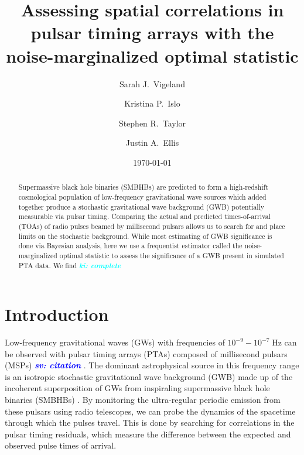 \documentclass[twocolumn,aps,prd,superscriptaddress]{revtex4-1}
\newcommand{\sv}[1]{\textcolor{blue}{\it{\textbf{sv: #1}}} }
\newcommand{\ki}[1]{\textcolor{cyan}{\it{\textbf{ki: #1}}} }
\begin{document}
\title{Assessing spatial correlations in pulsar timing arrays with the noise-marginalized optimal statistic}


\author{Sarah J.\ Vigeland}

\author{Kristina P.\ Islo}

\author{Stephen R.\ Taylor}

\author{Justin A.\ Ellis}

\date{\today}  

\begin{abstract}
Supermassive black hole binaries (SMBHBs) are predicted to form a high-redshift cosmological population of low-frequency gravitational wave sources which added together produce a stochastic gravitational wave background (GWB) potentially measurable via pulsar timing. Comparing the actual and predicted times-of-arrival (TOAs) of radio pulses beamed by millisecond pulsars allows us to search for and place limits on the stochastic background. While most estimating of GWB significance is done via Bayesian analysis, here we use a frequentist estimator called the noise-marginalized optimal statistic to assess the significance of a GWB present in simulated PTA data. We find \ki{complete}

\end{abstract}

\maketitle


\section{Introduction}

Low-frequency gravitational waves (GWs) with frequencies of 
$10^{-9} - 10^{-7} \; \mathrm{Hz}$ can be observed with pulsar timing arrays (PTAs) 
composed of millisecond pulsars (MSPs) \sv{citation}. 
The dominant astrophysical source in this frequency range is an isotropic stochastic 
gravitational wave background (GWB) 
made up of the incoherent superposition of GWs from inspiraling 
supermassive black hole binaries (SMBHBs) 
\citep{1995ApJ...446..543R, 2003ApJ...583..616J, 2003ApJ...590..691W}. 
By monitoring the ultra-regular periodic emission from these pulsars using radio telescopes, 
we can probe the dynamics of the spacetime through which the pulses travel. 
This is done by searching for correlations in the pulsar timing residuals, 
which measure the difference between the expected and observed pulse times of arrival.
\end{document}

